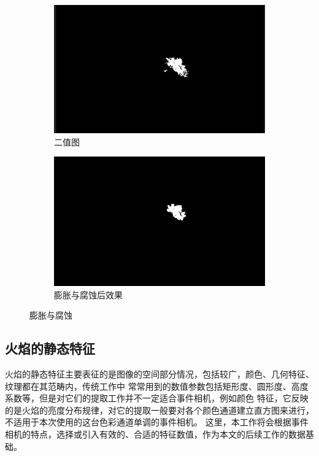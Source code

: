 \begin{figure}[ht]
    \centering
    \begin{subfigure}{0.49\textwidth}
        \centering
        \includegraphics[width=\textwidth]{figures/extract_process_03.png}
        \caption{二值图}
        \label{16.a}
    \end{subfigure}
    \hfill
    \begin{subfigure}{0.49\textwidth}
        \centering
        \includegraphics[width=\textwidth]{figures/extract_process_04.png}
        \caption{膨胀与腐蚀后效果}
        \label{16.b}
    \end{subfigure}
    \caption{膨胀与腐蚀}
    \label{16}
\end{figure}

\subsection{火焰的静态特征}
火焰的静态特征主要表征的是图像的空间部分情况，包括较广，颜色、几何特征、纹理都在其范畴内，传统工作中
常常用到的数值参数包括矩形度、圆形度、高度系数等，但是对它们的提取工作并不一定适合事件相机，例如颜色
特征，它反映的是火焰的亮度分布规律，对它的提取一般要对各个颜色通道建立直方图来进行，不适用于本次使用的这台色彩通道单调的事件相机。
这里，本工作将会根据事件相机的特点，选择或引入有效的、合适的特征数值，作为本文的后续工作的数据基础。

